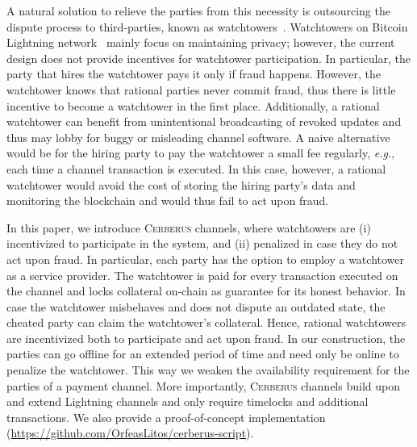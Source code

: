 \documentclass[runningheads]{llncs}
\newcommand{\eg}{{\em e.g.}}
\newcommand{\sys}{\textsc{Cerberus}\xspace}
\begin{document}
A natural solution to relieve the parties from this necessity is outsourcing the dispute process to third-parties, known as watchtowers~\cite{watchtowers,dryja2016monitors}. 
Watchtowers on Bitcoin Lightning network~\cite{poon2015lightning} mainly focus on maintaining privacy; however, the current design does not provide incentives for watchtower participation. 
In particular, the party that hires the watchtower pays it only if fraud happens. However, the watchtower knows that rational parties never commit fraud, thus there is little incentive to become a watchtower in the first place. Additionally, a rational watchtower can benefit from unintentional broadcasting of revoked updates and thus may lobby for buggy or misleading channel software. A naive alternative would be for the hiring party to pay the watchtower a small fee regularly, \eg, each time a channel transaction is executed. In this case, however, a rational watchtower would avoid the cost of storing the hiring party's data and monitoring the blockchain and would thus fail to act upon fraud.

In this paper, we introduce \sys channels, where watchtowers are (i) incentivized to participate in the system, and (ii) penalized in case they do not act upon fraud. 
In particular,
each party has the option to employ a watchtower as a service provider. The watchtower  is paid for every transaction executed on the channel and locks collateral on-chain as guarantee for its honest behavior. In case the watchtower misbehaves and does not dispute an outdated state, the cheated party can claim the watchtower's collateral. 
Hence, rational watchtowers are incentivized both to participate and act upon fraud. 
In our construction, the parties can go offline for an extended period of time and need only be online to penalize the watchtower. 
This way we weaken the availability requirement for the parties of a payment channel. 
More importantly, \sys channels build upon and extend Lightning channels and only require timelocks and additional transactions.%
We also provide a proof-of-concept implementation (\url{https://github.com/OrfeasLitos/cerberus-script}).
\end{document}
